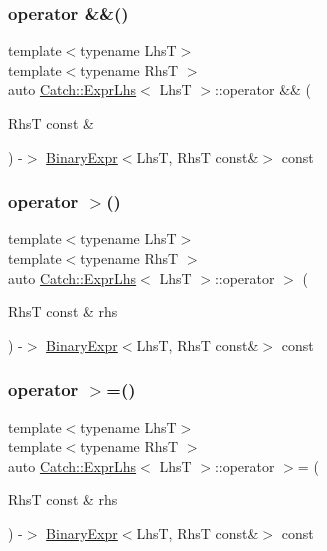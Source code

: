 \subsubsection{\texorpdfstring{operator \&\&()}{operator \&\&()}}
{\footnotesize\ttfamily template$<$typename LhsT$>$ \\
template$<$typename RhsT $>$ \\
auto \mbox{\hyperlink{class_catch_1_1_expr_lhs}{Catch\+::\+Expr\+Lhs}}$<$ LhsT $>$\+::operator \&\& (\begin{DoxyParamCaption}\item[{RhsT const \&}]{ }\end{DoxyParamCaption}) -\/$>$ \mbox{\hyperlink{class_catch_1_1_binary_expr}{Binary\+Expr}}$<$LhsT, RhsT const\&$>$ const \hspace{0.3cm}{\ttfamily [inline]}}

\mbox{\label{class_catch_1_1_expr_lhs_af4f6dc7eeac031cfdc4fd4b78517e5b8}} 
\subsubsection{\texorpdfstring{operator $>$()}{operator >()}}
{\footnotesize\ttfamily template$<$typename LhsT$>$ \\
template$<$typename RhsT $>$ \\
auto \mbox{\hyperlink{class_catch_1_1_expr_lhs}{Catch\+::\+Expr\+Lhs}}$<$ LhsT $>$\+::operator $>$ (\begin{DoxyParamCaption}\item[{RhsT const \&}]{rhs }\end{DoxyParamCaption}) -\/$>$ \mbox{\hyperlink{class_catch_1_1_binary_expr}{Binary\+Expr}}$<$LhsT, RhsT const\&$>$ const \hspace{0.3cm}{\ttfamily [inline]}}

\mbox{\label{class_catch_1_1_expr_lhs_a621240eaaf40e186cd96511c1d29d7b0}} 
\subsubsection{\texorpdfstring{operator $>$=()}{operator >=()}}
{\footnotesize\ttfamily template$<$typename LhsT$>$ \\
template$<$typename RhsT $>$ \\
auto \mbox{\hyperlink{class_catch_1_1_expr_lhs}{Catch\+::\+Expr\+Lhs}}$<$ LhsT $>$\+::operator $>$= (\begin{DoxyParamCaption}\item[{RhsT const \&}]{rhs }\end{DoxyParamCaption}) -\/$>$ \mbox{\hyperlink{class_catch_1_1_binary_expr}{Binary\+Expr}}$<$LhsT, RhsT const\&$>$ const \hspace{0.3cm}{\ttfamily [inline]}}

